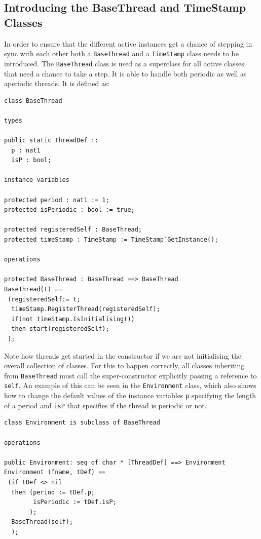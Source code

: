 \documentclass{overturerepchap}
\begin{document}
\subsection{Introducing the BaseThread and TimeStamp Classes}

In order to ensure that the different active instances get a chance of
stepping in sync with each other both a \texttt{BaseThread} and a
\texttt{TimeStamp} class needs to be introduced. The \texttt{BaseThread}
class is used as a superclass for all active classes that need a chance to 
take a step. It is able to handle both periodic as well as aperiodic threads.
It is defined as:

\begin{lstlisting}
class BaseThread
	
types

public static ThreadDef ::
  p : nat1
  isP : bool;

instance variables

protected period : nat1 := 1;
protected isPeriodic : bool := true;

protected registeredSelf : BaseThread;
protected timeStamp : TimeStamp := TimeStamp`GetInstance();

operations

protected BaseThread : BaseThread ==> BaseThread
BaseThread(t) ==
 (registeredSelf:= t;
  timeStamp.RegisterThread(registeredSelf);
  if(not timeStamp.IsInitialising())
  then start(registeredSelf);  
 );
\end{lstlisting}
\noindent Note how threads get started in the constructor if we are not
initialising the overall collection of classes. For this to happen correctly, all classes inheriting from \texttt{BaseThread} must call the super-constructor explicitly passing a reference to \texttt{self}. An example of this can be seen in the \texttt{Environment} class, which also shows how to change the default values of the instance variables \texttt{p} specifying the length of a period and \texttt{isP} that specifies if the thread is periodic or not.

\begin{lstlisting}
class Environment is subclass of BaseThread

operations

public Environment: seq of char * [ThreadDef] ==> Environment
Environment (fname, tDef) ==
 (if tDef <> nil
  then (period := tDef.p;
        isPeriodic := tDef.isP;
       );
  BaseThread(self);
  );
\end{lstlisting}
\end{document}
